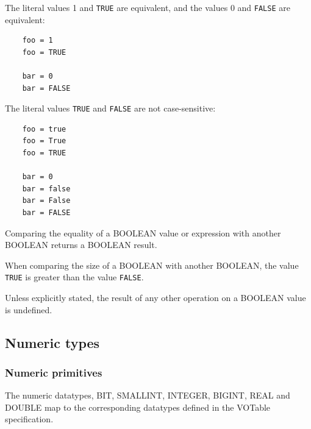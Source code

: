 \documentclass[11pt,a4paper]{ivoa}
\newcommand{\VOTspec}{VOTable specification\xspace}
\begin{document}
The literal values 1 and \verb:TRUE: are equivalent,
and the values 0 and \verb:FALSE: are equivalent:
\begin{verbatim}
    foo = 1
    foo = TRUE

    bar = 0
    bar = FALSE
\end{verbatim}

The literal values \verb:TRUE: and \verb:FALSE:
are not case-sensitive:
\begin{verbatim}
    foo = true
    foo = True
    foo = TRUE

    bar = 0
    bar = false
    bar = False
    bar = FALSE
\end{verbatim}

Comparing the equality of a BOOLEAN value or expression with another
BOOLEAN returns a BOOLEAN result.

When comparing the size of a BOOLEAN with another BOOLEAN, the value
\verb:TRUE: is greater than the value \verb:FALSE:.

Unless explicitly stated, the result of any other operation on a BOOLEAN
value is undefined.

\subsection{Numeric types}
\label{sec:types.numeric}

\subsubsection{Numeric primitives}
\label{sec:types.numeric.primitive}

The numeric datatypes, BIT, SMALLINT, INTEGER, BIGINT, REAL
and DOUBLE map to the corresponding datatypes defined
in the \VOTspec.
\end{document}
